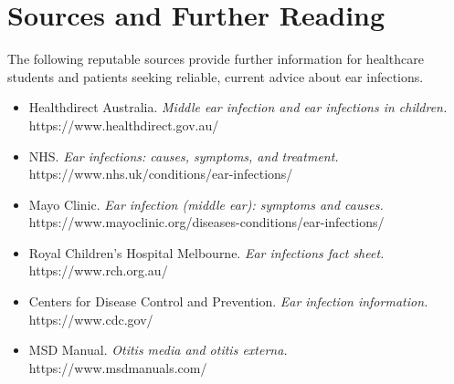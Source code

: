 \section*{Sources and Further Reading}
The following reputable sources provide further information for healthcare students and patients seeking reliable, current advice about ear infections.
\begin{itemize}
    \item Healthdirect Australia. \textit{Middle ear infection and ear infections in children.} https://www.healthdirect.gov.au/
    \item NHS. \textit{Ear infections: causes, symptoms, and treatment.} https://www.nhs.uk/conditions/ear-infections/
    \item Mayo Clinic. \textit{Ear infection (middle ear): symptoms and causes.} https://www.mayoclinic.org/diseases-conditions/ear-infections/
    \item Royal Children's Hospital Melbourne. \textit{Ear infections fact sheet.} https://www.rch.org.au/
    \item Centers for Disease Control and Prevention. \textit{Ear infection information.} https://www.cdc.gov/
    \item MSD Manual. \textit{Otitis media and otitis externa.} https://www.msdmanuals.com/
\end{itemize}
